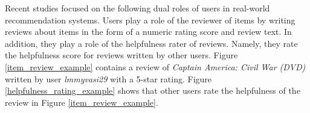 \documentclass[master,english,final]{kaist-ucs}
\begin{document}
Recent studies \cite{RQMF,DualRole} focused on the following dual roles of users in real-world recommendation systems.
Users play a role of the reviewer of items by writing reviews about items in the form of a numeric rating score and review text.
In addition, they play a role of the helpfulness rater of reviews.
Namely, they rate the helpfulness score for reviews written by other users.
Figure \ref{item_review_example} contains a review of \textit{Captain America: Civil War (DVD)} written by user \textit{lmmyvasi29} with a 5-star rating.
Figure \ref{helpfulness_rating_example} shows that other users rate the helpfulness of the review in Figure \ref{item_review_example}.
\end{document}
